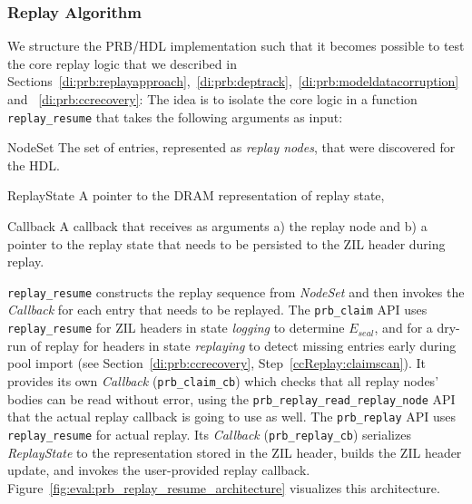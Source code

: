 \documentclass[12pt,a4paper,twoside]{book}
\begin{document}
\subsubsection{Replay Algorithm}
We structure the PRB/HDL implementation such that it becomes possible to test the core replay logic that we described in Sections~\ref{di:prb:replayapproach},~\ref{di:prb:deptrack},~\ref{di:prb:modeldatacorruption} and ~\ref{di:prb:ccrecovery}:
The idea is to isolate the core logic in a function \lstinline{replay_resume} that takes the following arguments as input:
\begin{description}[noitemsep,leftmargin=1.5cm,labelindent=1cm]
    \item[NodeSet] The set of entries, represented as \textit{replay nodes}, that were discovered for the HDL.
    \item[ReplayState] A pointer to the DRAM representation of replay state,
    \item[Callback] A callback that receives as arguments
    a) the replay node and b) a pointer to the replay state that needs to be persisted to the ZIL header during replay.
\end{description}
\lstinline{replay_resume} constructs the replay sequence from \textit{NodeSet} and then invokes the \textit{Callback} for each entry that needs to be replayed.
The \lstinline{prb_claim} API uses \lstinline{replay_resume} for ZIL headers in state \textit{logging} to determine $E_{seal}$, and for a dry-run of replay for headers in state \textit{replaying} to detect missing entries early during pool import (see Section~\ref{di:prb:ccrecovery}, Step~\ref{ccReplay:claimscan}).
It provides its own \textit{Callback} (\lstinline{prb_claim_cb}) which checks that all replay nodes' bodies can be read without error, using the \lstinline{prb_replay_read_replay_node} API that the actual replay callback is going to use as well.
The \lstinline{prb_replay} API uses \lstinline{replay_resume} for actual replay.
Its \textit{Callback} (\lstinline{prb_replay_cb}) serializes \textit{ReplayState} to the representation stored in the ZIL header, builds the ZIL header update, and invokes the user-provided replay callback.
Figure~\ref{fig:eval:prb_replay_resume_architecture} visualizes this architecture.
\end{document}
